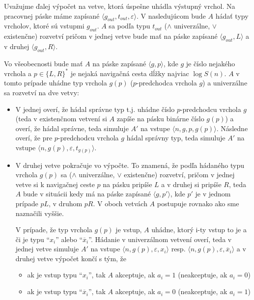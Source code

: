 {\begin{dokaz}
Uvažujme ďalej výpočet na vetve, ktorá úspešne uhádla výstupný
vrchol. Na pracovnej páske máme zapísané $\langle
g_{out},t_{out},\varepsilon\rangle $. V nasledujúcom bude $A$
hádať typy vrcholov, ktoré sú vstupmi $g_{out}$. $A$ sa podľa typu
$t_{out}$ ($\wedge$ univerzálne, $\vee$ existenčne) rozvetví
pričom v jednej vetve bude mať na páske zapísané $\langle
g_{out},L\rangle $ a v druhej $\langle g_{out},R\rangle $.

Vo všeobecnosti bude mať $A$ na páske zapísané $\langle g,p\rangle $,
kde $g$ je číslo nejakého vrchola a $p\in\{ L,R\}^*$ je nejaká
navigačná cesta dĺžky najviac $\log S(n)$. $A$ v tomto prípade
uhádne typ vrchola $g(p)$ ($p$-predchodca vrchola $g$) a univerzálne
sa rozvetví na dve vetvy:
\begin{itemize}
  \item V jednej overí, že hádal správne typ t.j. uhádne číslo
  $p$-predchodcu vrchola $g$ (teda v existenčnom vetvení si $A$
  zapíše na pásku binárne číslo $g(p)$) a overí, že hádal správne,
  teda simuluje $A'$ na vstupe $\langle n,g,p,g(p)\rangle $. Následne overí, že
  pre $p$-predchodcu vrchola $g$ hádal správny typ, teda simuluje
  $A'$ na vstupe $\langle n,g(p),\varepsilon,t_{g(p)}\rangle $.
  \item V druhej vetve pokračuje vo výpočte. To znamená, že podľa
  hádaného typu vrchola $g(p)$ sa ($\wedge$ univerzálne, $\vee$
  existenčne) rozvetví, pričom v jednej vetve si k navigačnej
  ceste $p$ na pásku pripíše $L$ a v druhej si pripíše $R$, teda
  $A$ bude v situácii kedy má na páske zapísané $\langle g,p'\rangle $, kde $p'$
  je v jednom prípade $pL$, v druhom $pR$. V oboch vetvách $A$
  postupuje rovnako ako sme naznačili vyššie.

  V prípade, že typ vrchola $g(p)$ je vstup, $A$ uhádne, ktorý
  i-ty vstup to je a či je typu ``$x_i$'' alebo
  ``$\overline{x}_i$''. Hádanie v univerzálnom vetvení overí, teda
  v jednej vetve simuluje $A'$ na vstupe
  $\langle n,g(p),\varepsilon,x_i\rangle $ resp.
  $\langle n,g(p),\varepsilon,\overline{x}_i\rangle $ a v druhej vetve výpočet
  končí s tým, že
  \begin{itemize}
    \item ak je vstup typu ``$x_i$'', tak $A$ akceptuje, ak $a_i=1$
    (neakceptuje, ak $a_i=0$)
    \item ak je vstup typu ``$\overline{x}_i$'', tak $A$
    akceptuje, ak $a_i=0$ (neakceptuje, ak $a_i=1$)
  \end{itemize}
\end{itemize}


\end{dokaz}}
